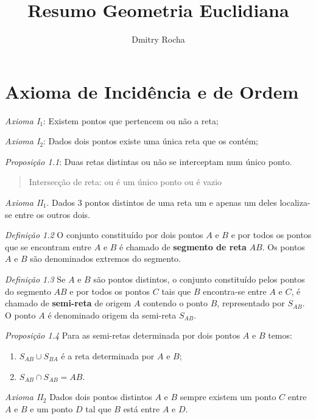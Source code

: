 \documentclass[11pt]{article}
\author{Dmitry Rocha}
\title{Resumo Geometria Euclidiana}
\begin{document}
\maketitle


\section{Axioma de Incidência e de Ordem}


\emph{Axioma I$_{1}$}: Existem pontos que pertencem ou não a reta;

\emph{Axioma I$_{2}$}: Dados dois pontos existe uma única reta que os contém;

\emph{Proposição 1.1}: Duas retas distintas ou não se interceptam num único
ponto.

\begin{quote}
  Intersecção de reta: ou é um único ponto ou é vazio
\end{quote}


\emph{Axioma II$_{1}$}. Dados 3 pontos distintos de uma reta um e apenas um deles
localiza-se entre os outros dois.

\emph{Definição 1.2} O conjunto constituído por dois pontos $A$ e $B$ e por
todos os pontos que se encontram entre $A$ e $B$ é chamado de \textbf{segmento de
reta} $AB$. Os pontos $A$ e $B$ são denominados extremos do segmento.

\emph{Definição 1.3} Se $A$ e $B$ são pontos distintos, o conjunto
constituído pelos pontos do segmento $AB$ e por todos os pontos $C$ tais que
$B$ encontra-se entre $A$ e $C$, é chamado de \textbf{semi-reta} de origem $A$
contendo o ponto $B$, representado por $S_{AB}$. O ponto $A$ é denominado
origem da semi-reta $S_{AB}$.

\emph{Proposição 1.4} Para as semi-retas determinada por dois pontos $A$ e
$B$ temos:

\begin{enumerate} \itemsep1pt \parskip0pt 
\item $S_{AB} \cup S_{BA}$ é a reta determinada por $A$ e $B$;
\item $S_{AB} \cap S_{AB} = AB$.
\end{enumerate}

\emph{Axioma II$_{2}$} Dados dois pontos distintos $A$ e $B$ sempre existem um ponto $C$
entre $A$ e $B$ e um ponto $D$ tal que $B$ está entre $A$ e $D$.
\end{document}
